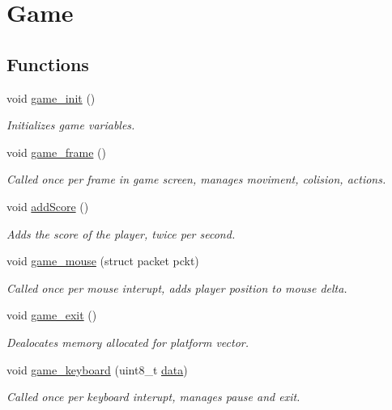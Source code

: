 \hypertarget{group__Game}{}\section{Game}
\label{group__Game}
\subsection*{Functions}
\begin{DoxyCompactItemize}
\item 
void \hyperlink{group__Game_ga5f5ccbe5abfdef24c8378dc3cf32ffb3}{game\+\_\+init} ()
\begin{DoxyCompactList}\small\item\em Initializes game variables. \end{DoxyCompactList}\item 
void \hyperlink{group__Game_gad1af7212c4703893c625ad5a5e9107e0}{game\+\_\+frame} ()
\begin{DoxyCompactList}\small\item\em Called once per frame in game screen, manages moviment, colision, actions. \end{DoxyCompactList}\item 
void \hyperlink{group__Game_ga3f24f1f331ba8708f4661eec7872b914}{add\+Score} ()
\begin{DoxyCompactList}\small\item\em Adds the score of the player, twice per second. \end{DoxyCompactList}\item 
void \hyperlink{group__Game_ga096eca75e6305cefa8171bda34e5ae42}{game\+\_\+mouse} (struct packet pckt)
\begin{DoxyCompactList}\small\item\em Called once per mouse interupt, adds player position to mouse delta. \end{DoxyCompactList}\item 
void \hyperlink{group__Game_gad082b8fe4e94ee090f0c6c9d11b4d565}{game\+\_\+exit} ()
\begin{DoxyCompactList}\small\item\em Dealocates memory allocated for platform vector. \end{DoxyCompactList}\item 
void \hyperlink{group__Game_ga51812b928d0d9e7b80bc06c044e7f5ce}{game\+\_\+keyboard} (uint8\+\_\+t \hyperlink{group__Proj_ga325819a8e492ac69542e8b31705af6e9}{data})
\begin{DoxyCompactList}\small\item\em Called once per keyboard interupt, manages pause and exit. \end{DoxyCompactList}\end{DoxyCompactItemize}
